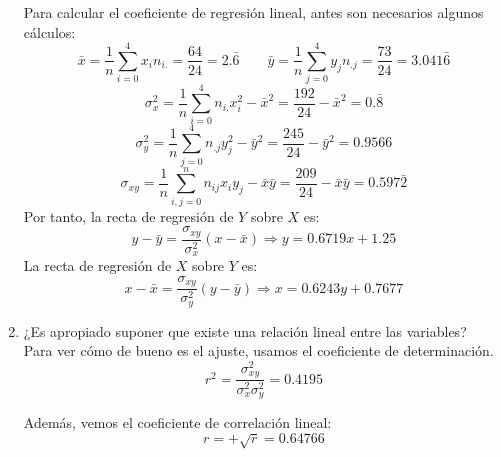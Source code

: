 \begin{ejercicio}
\begin{enumerate}
        Para calcular el coeficiente de regresión lineal, antes son necesarios algunos cálculos:
        \begin{equation*}
            \bar{x} = \frac{1}{n}\sum_{i=0}^4 x_in_{i.} = \frac{64}{24} = 2.\bar{6}
            \qquad
            \bar{y} = \frac{1}{n}\sum_{j=0}^4 y_jn_{.j} = \frac{73}{24} = 3.041\bar{6}
        \end{equation*}
        \begin{equation*}
            \sigma_x^2 = \frac{1}{n}\sum_{i=0}^4 n_{i.}x_i^2 - \bar{x}^2
            = \frac{192}{24} - \bar{x}^2 = 0.\bar{8}
        \end{equation*}
        \begin{equation*}
            \sigma_y^2 = \frac{1}{n}\sum_{j=0}^4 n_{.j}y_j^2 - \bar{y}^2
            = \frac{245}{24} - \bar{y}^2 = 0.9566
        \end{equation*}
        \begin{equation*}
            \sigma_{xy} = \frac{1}{n}\sum_{i,j=0}^n n_{ij}x_iy_j - \bar{x}\bar{y} = \frac{209}{24} - \bar{x}\bar{y} = 0.597\bar{2}
        \end{equation*}
        Por tanto, la recta de regresión de $Y$ sobre $X$ es:
        \begin{equation*}
            y-\bar{y} = \frac{\sigma_{xy}}{\sigma_x^2}(x-\bar{x}) \Longrightarrow
            y = 0.6719x +1.25
        \end{equation*}
        La recta de regresión de $X$ sobre $Y$ es:
        \begin{equation*}
            x-\bar{x} = \frac{\sigma_{xy}}{\sigma_y^2}(y-\bar{y}) \Longrightarrow
            x = 0.6243y +0.7677
        \end{equation*}
    
        \item ¿Es apropiado suponer que existe una relación lineal entre las variables?\\

        Para ver cómo de bueno es el ajuste, usamos el coeficiente de determinación.
        \begin{equation*}
            r^2 = \frac{\sigma_{xy}^2}{\sigma_x^2 \sigma_y^2} = 0.4195
        \end{equation*}

        Además, vemos el coeficiente de correlación lineal:
        \begin{equation*}
            r = +\sqrt{r} = 0.64766
        \end{equation*}


\end{enumerate}
\end{ejercicio}
